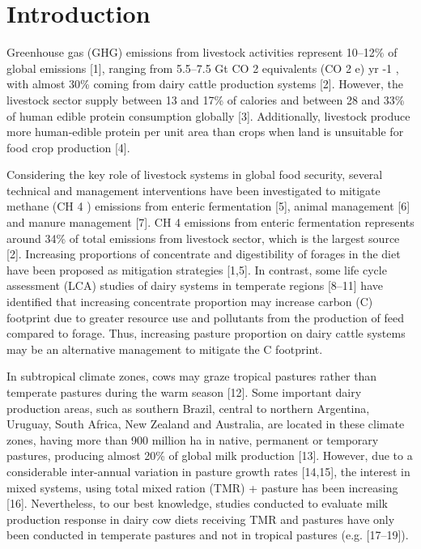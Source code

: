 \documentclass[11pt,a4paper]{article}
\begin{document}
\section{Introduction}

Greenhouse gas (GHG) emissions from livestock activities represent 10–12\% of global emissions [1], ranging from 5.5–7.5 Gt CO 2 equivalents (CO 2 e) yr -1 , with almost 30\% coming from dairy cattle production systems [2]. However, the livestock sector supply between 13 and 17\% of calories and between 28 and 33\% of human edible protein consumption globally [3]. Additionally, livestock produce more human-edible protein per unit area than crops when land is unsuitable for food crop production [4].

Considering the key role of livestock systems in global food security, several technical and management interventions have been investigated to mitigate methane (CH 4 ) emissions from enteric fermentation [5], animal management [6] and manure management [7]. CH 4 emissions from enteric fermentation represents around 34\% of total emissions from livestock sector, which is the largest source [2]. Increasing proportions of concentrate and digestibility of forages in the diet have been proposed as mitigation strategies [1,5]. In contrast, some life cycle assessment (LCA) studies of dairy systems in temperate regions [8–11] have identified that increasing concentrate proportion may increase carbon (C) footprint due to greater resource use and pollutants from the production of feed compared to forage. Thus, increasing pasture proportion on dairy cattle systems may be an alternative management to mitigate the C footprint.

In subtropical climate zones, cows may graze tropical pastures rather than temperate pastures during the warm season [12]. Some important dairy production areas, such as southern Brazil, central to northern Argentina, Uruguay, South Africa, New Zealand and Australia, are located in these climate zones, having more than 900 million ha in native, permanent or temporary pastures, producing almost 20\% of global milk production [13]. However, due to a considerable inter-annual variation in pasture growth rates [14,15], the interest in mixed systems, using total mixed ration (TMR) + pasture has been increasing [16]. Nevertheless, to our best knowledge, studies conducted to evaluate milk production response in dairy cow diets receiving TMR and pastures have only been conducted in temperate pastures and not in tropical pastures (e.g. [17–19]).
\end{document}
